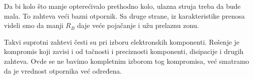 Da bi kolo što manje opterećivalo prethodno kolo, ulazna struja treba da bude mala. To zahteva veći bazni otpornik. Sa druge strane, iz karakteristike prenosa videli smo da manji $R_B$ daje veće pojačanje i užu prelaznu zonu.

Takvi suprotni zahtevi česti su pri izboru elektronskih komponenti. Rešenje je kompromis koji zavisi i od tačnosti i preciznosti komponenti, disipacije i drugih zahteva. Ovde se ne bavimo kompletnim izborom tog kompromisa, već smatramo da je vrednost otpornika već određena.
